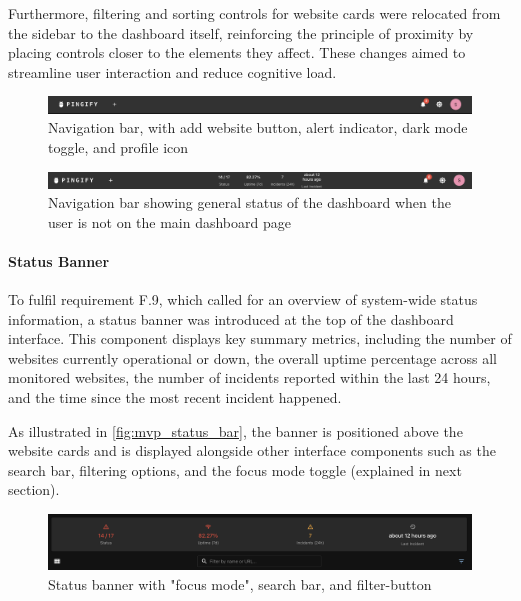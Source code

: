 Furthermore, filtering and sorting controls for website cards were relocated from the sidebar to the dashboard itself, reinforcing the principle of proximity by placing controls closer to the elements they affect. These changes aimed to streamline user interaction and reduce cognitive load.

\begin{figure}[H]
\centering
\includegraphics[width=1\linewidth]{figures/MVP-dashboard/navbar-mvp.png}
\caption{Navigation bar, with add website button, alert indicator, dark mode toggle, and profile icon}
\label{fig:mvp_navbar}
\end{figure}

\begin{figure}[H]
\centering
\includegraphics[width=1\linewidth]{figures/MVP-dashboard/navbar-mvp-status.png}
\caption{Navigation bar showing general status of the dashboard when the user is not on the main dashboard page}
\label{fig:mvp_navbar_status}
\end{figure}

\paragraph{Status Banner}

To fulfil requirement F.9, which called for an overview of system-wide status information, a status banner was introduced at the top of the dashboard interface. This component displays key summary metrics, including the number of websites currently operational or down, the overall uptime percentage across all monitored websites, the number of incidents reported within the last 24 hours, and the time since the most recent incident happened.

As illustrated in \autoref{fig:mvp_status_bar}, the banner is positioned above the website cards and is displayed alongside other interface components such as the search bar, filtering options, and the focus mode toggle (explained in next section).

\begin{figure}[H]
\centering
\includegraphics[width=0.8\linewidth]{figures/MVP-dashboard/MVP-statusbanner.png}
\caption{Status banner with "focus mode", search bar, and filter-button}
\label{fig:mvp_status_bar}
\end{figure}



